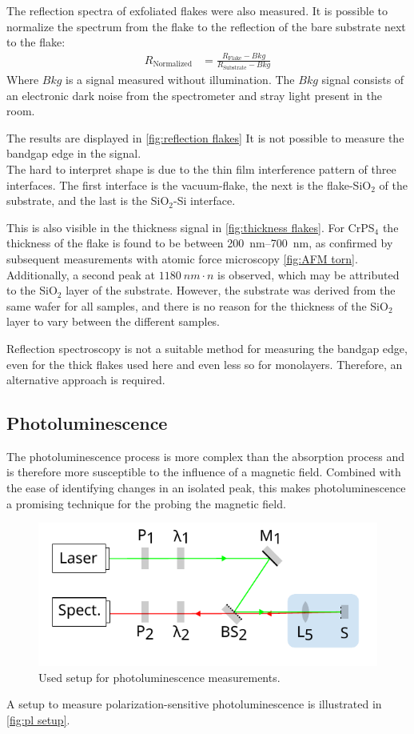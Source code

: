 \documentclass[
	oneside,
	parskip=half,
	a4paper,
]{scrbook}
\begin{document}
The reflection spectra of exfoliated flakes were also measured.
It is possible to normalize the spectrum from the flake to the reflection of the bare substrate next to the flake:
\begin{align}
	R_\text{Normalized} &= \frac{R_\text{Flake} - Bkg}{R_\text{Substrate} - Bkg}
\end{align}
Where $Bkg$ is a signal measured without illumination. 
The $Bkg$ signal consists of an electronic dark noise from the spectrometer and stray light present in the room.

The results are displayed in \autoref{fig:reflection flakes}
It is not possible to measure the bandgap edge in the signal.\\
The hard to interpret shape is due to the thin film interference pattern of three interfaces.
The first interface is the vacuum-flake, the next is the flake-SiO$_2$ of the substrate, and the last is the SiO$_2$-Si interface.

This is also visible in the thickness signal in \autoref{fig:thickness flakes}.
For CrPS$_4$ the thickness of the flake is found to be between \SIrange{200}{700}{nm}, as confirmed by subsequent measurements with atomic force microscopy \autoref{fig:AFM torn}.\\
Additionally, a second peak at $\SI{1180}{nm}\cdot n$ is observed, which may be attributed to the SiO$_2$ layer of the substrate. 
However, the substrate was derived from the same wafer for all samples, and there is no reason for the thickness of the SiO$_2$ layer to vary between the different samples.

Reflection spectroscopy is not a suitable method for measuring the bandgap edge, even for the thick flakes used here and even less so for monolayers. 
Therefore, an alternative approach is required.

\subsection{Photoluminescence}
The photoluminescence process is more complex than the absorption process and is therefore more susceptible to the influence of a magnetic field. 
Combined with the ease of identifying changes in an isolated peak, this makes photoluminescence a promising technique for the probing the magnetic field.

\begin{figure}
	\centering
	\includegraphics{../figures/setup_simplified.pdf}
	\caption{Used setup for photoluminescence measurements.}
	\label{fig:pl setup}
\end{figure}
A setup to measure polarization-sensitive photoluminescence is illustrated in \autoref{fig:pl setup}.
\end{document}
